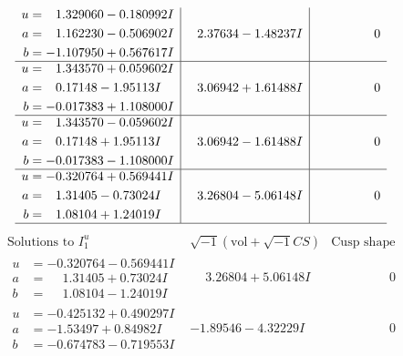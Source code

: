 \documentclass[1p]{elsarticle_modified}
\theoremstyle{definition}
\newcommand{\I}{\sqrt{-1}}
\begin{document}
$$\begin{array}{c|c|c}
\begin{aligned}
u &= \phantom{-}1.329060 - 0.180992 I \\
a &= \phantom{-}1.162230 - 0.506902 I \\
b &= -1.107950 + 0.567617 I\end{aligned}
 & \phantom{-}2.37634 - 1.48237 I & \phantom{-0.000000 } 0 \\ \hline\begin{aligned}
u &= \phantom{-}1.343570 + 0.059602 I \\
a &= \phantom{-}0.17148 - 1.95113 I \\
b &= -0.017383 + 1.108000 I\end{aligned}
 & \phantom{-}3.06942 + 1.61488 I & \phantom{-0.000000 } 0 \\ \hline\begin{aligned}
u &= \phantom{-}1.343570 - 0.059602 I \\
a &= \phantom{-}0.17148 + 1.95113 I \\
b &= -0.017383 - 1.108000 I\end{aligned}
 & \phantom{-}3.06942 - 1.61488 I & \phantom{-0.000000 } 0 \\ \hline\begin{aligned}
u &= -0.320764 + 0.569441 I \\
a &= \phantom{-}1.31405 - 0.73024 I \\
b &= \phantom{-}1.08104 + 1.24019 I\end{aligned}
 & \phantom{-}3.26804 - 5.06148 I & \phantom{-0.000000 } 0\\
 \hline 
 \end{array}$$\newpage$$\begin{array}{c|c|c}  
\text{Solutions to }I^u_{1}& \I (\text{vol} + \sqrt{-1}CS) & \text{Cusp shape}\\
 \hline 
\begin{aligned}
u &= -0.320764 - 0.569441 I \\
a &= \phantom{-}1.31405 + 0.73024 I \\
b &= \phantom{-}1.08104 - 1.24019 I\end{aligned}
 & \phantom{-}3.26804 + 5.06148 I & \phantom{-0.000000 } 0 \\ \hline\begin{aligned}
u &= -0.425132 + 0.490297 I \\
a &= -1.53497 + 0.84982 I \\
b &= -0.674783 - 0.719553 I\end{aligned}
 & -1.89546 - 4.32229 I & \phantom{-0.000000 } 0 \\ \hline\begin{aligned}

\end{aligned}
\end{array}$$
\end{document}
